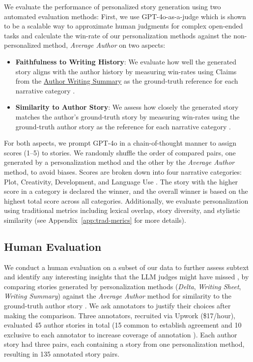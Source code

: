 We evaluate the performance of personalized story generation using two automated evaluation methods: 
First, we use GPT-4o-as-a-judge which is shown to be a scalable way to approximate human judgments for complex open-ended tasks \citep{zheng2023judging} and calculate the win-rate of our personalization methods against the non-personalized method, \emph{Average Author} on two aspects: 
\begin{itemize}[noitemsep, topsep=0pt]
    \item \textbf{Faithfulness to Writing History}: We evaluate how well the generated story aligns with the author history by measuring win-rates using Claims from the \hyperlink{sec:writing-summary}{Author Writing Summary} as the ground-truth reference for each narrative category \citep{wang-etal-2024-rolellm, wang2023automated, yunusov-etal-2024-mirrorstories}.
    \item \textbf{Similarity to Author Story}: We assess how closely the generated story matches the author's ground-truth story by measuring win-rates using the ground-truth author story as the reference for each narrative category \citep{lyu2024href, shashidhar-etal-2024-unsupervised}.
\end{itemize}
For both aspects, we prompt GPT-4o in a chain-of-thought manner \citep{wei2022chain} to assign scores (1–5) to stories. We randomly shuffle the order of compared pairs, one generated by a personalization method and the other by the \emph{Average Author} method, to avoid biases. Scores are broken down into four narrative categories: Plot, Creativity, Development, and Language Use \citep{saha-etal-2024-branch}. The story with the higher score in a category is declared the winner, and the overall winner is based on the highest total score across all categories. Additionally, we evaluate personalization using traditional metrics \citep{xie-etal-2023-next} including lexical overlap, story diversity, and stylistic similarity (see Appendix~\ref{app:trad-merics} for more details).



\subsection{Human Evaluation}
\label{sec:human-eval-story-gen}

We conduct a human evaluation on a subset of our data to further assess subtext and identify any interesting insights that the LLM judges might have missed \citep{chakrabarty2024art, subbiah-etal-2024-reading}, by comparing stories generated by personalization methods (\emph{Delta}, \emph{Writing Sheet}, \emph{Writing Summary}) against the \emph{Average Author} method for similarity to the ground-truth author story \citep{lyu2024href}. We ask annotators to justify their choices after making the comparison. Three annotators, recruited via Upwork (\$17/hour), evaluated 45 author stories in total (15 common to establish agreement and 10 exclusive to each annotator to increase coverage of annotation \citep{song-etal-2024-veriscore}). Each author story had three pairs, each containing a story from one personalization method, resulting in 135 annotated story pairs.
